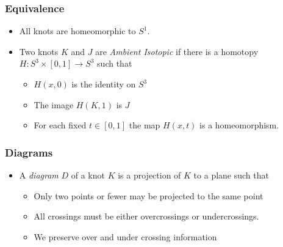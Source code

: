 \documentclass{beamer}
\begin{document}
\begin{frame}
  \frametitle{Equivalence}
  \begin{itemize}
  \item All knots are homeomorphic to $S^1$.
  \item Two knots $K$ and $J$ are \textit{Ambient Isotopic}
    if there is a homotopy $H:S^3\times[0,1]\rightarrow S^3$ such that
    \begin{itemize}
      \pause
    \item $H(x,0)$ is the identity on $S^3$
      \pause
    \item The image $H(K,1)$ is $J$
      \pause
    \item For each fixed $t\in[0,1]$ the map $H(x,t)$ is a
      homeomorphism.
    \end{itemize}
  \end{itemize}
\end{frame}

\begin{frame}
  \frametitle{Diagrams}
  \begin{itemize}
  \item A \textit{diagram} $D$ of a knot $K$ is a projection of
    $K$ to a plane such that
    \begin{itemize}
      \pause
    \item Only two points or fewer may be projected to the same
      point
      \pause
    \item All crossings must be either overcrossings or undercrossings.
      \pause
    \item We preserve over and under crossing information      
    \end{itemize}
    \begin{center}
    \end{center}
  \end{itemize}
\end{frame}
\end{document}
